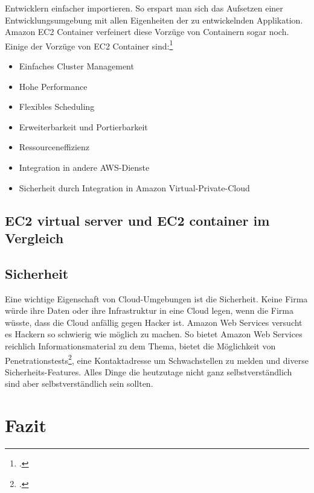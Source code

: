 \documentclass[titlepage]{report}
\begin{document}
Entwicklern einfacher importieren. So erspart man sich das Aufsetzen
einer Entwicklungsumgebung mit allen Eigenheiten der zu entwickelnden
Applikation. Amazon EC2 Container verfeinert diese Vorzüge von
Containern sogar noch. Einige der Vorzüge von EC2 Container
sind:\footcite{container}
\begin{itemize}
    \item Einfaches Cluster Management
    \item Hohe Performance
    \item Flexibles Scheduling
    \item Erweiterbarkeit und Portierbarkeit
    \item Ressourceneffizienz
    \item Integration in andere AWS\hyp{}Dienste
    \item Sicherheit durch Integration in Amazon Virtual\hyp{}Private\hyp{}Cloud
\end{itemize}
\section*{EC2 virtual server und EC2 container im Vergleich}
\section*{Sicherheit}
Eine wichtige Eigenschaft von Cloud\hyp{}Umgebungen ist die Sicherheit.
Keine Firma würde ihre Daten oder ihre Infrastruktur in eine Cloud
legen, wenn die Firma wüsste, dass die Cloud anfällig gegen Hacker ist.
Amazon Web Services versucht es Hackern so schwierig wie möglich zu
machen. So bietet Amazon Web Services reichlich Informationsmaterial zu
dem Thema, bietet die Möglichkeit von
Penetrationstests\footcite{penetration}, eine
Kontaktadresse um Schwachstellen zu melden und diverse
Sicherheits\hyp{}Features. Alles Dinge die heutzutage nicht ganz
selbstverständlich sind aber selbstverständlich sein sollten.
\chapter*{Fazit}
\nocite{*}
\printbibliography
\listoffigures
\end{document}
